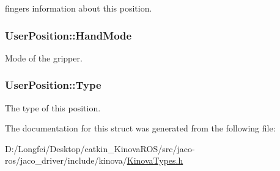 fingers information about this position. 

\subsubsection[{\texorpdfstring{Hand\+Mode}{HandMode}}]{ User\+Position\+::\+Hand\+Mode}\hypertarget{structUserPosition_a83779902810d0e5e16d533e0f964c0df}{}\label{structUserPosition_a83779902810d0e5e16d533e0f964c0df}


Mode of the gripper. 

\subsubsection[{\texorpdfstring{Type}{Type}}]{ User\+Position\+::\+Type}\hypertarget{structUserPosition_a93c748d4ee51239fcbcd487d88e52ffa}{}\label{structUserPosition_a93c748d4ee51239fcbcd487d88e52ffa}


The type of this position. 



The documentation for this struct was generated from the following file\+:\begin{DoxyCompactItemize}
\item 
D\+:/\+Longfei/\+Desktop/catkin\+\_\+\+Kinova\+R\+O\+S/src/jaco-\/ros/jaco\+\_\+driver/include/kinova/\hyperlink{KinovaTypes_8h}{Kinova\+Types.\+h}\end{DoxyCompactItemize}
